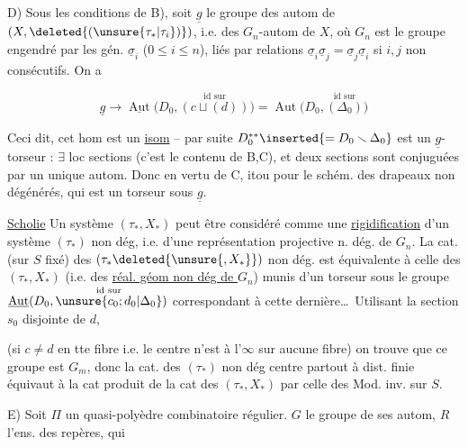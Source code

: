 
D) Sous les conditions de B), soit  $\underline g$ le groupe des autom de $(X,\deleted{(\unsure{\tau_*|\tau_i})})$, i.e. des $G_n$-autom de $X$, où $G_n$ est le groupe engendré par les gén. $\underline\sigma_i$ ($0\leq i\leq n$), liés par relations $\underline\sigma_i\underline\sigma_j=\underline\sigma_j\underline\sigma_i$ si $i,j$ non consécutifs. On a 

\[
\underline g\longrightarrow\underline{\operatorname{Aut}}\bigl(D_0,\overset{\text{id sur}}{(c\sqcup(d))}\bigr)
=\operatorname{Aut}\bigl(D_0,\overset{\text{id sur}}{(\Delta_0)}\bigr)
\]




Ceci dit, cet hom est un \uline{isom} -- par suite $D_0^{**}\inserted{=D_0\smallsetminus\Delta_0}$ est un $\underline g$-torseur : $\exists$ loc sections (c'est le contenu de B,C), et deux sections sont conjuguées par un unique autom. Donc  en vertu de C, itou pour le schém. des \inserted{$(\tau_*)$-}drapeaux non dégénérés, qui est un torseur sous $\underline g$.

\uline{Scholie} Un système $(\tau_*,X_*)$  peut être considéré comme une \uline{rigidification} d'un système $(\tau_*)$ non dég, i.e. d'une représentation projective n. dég. de $G_n$. La cat. (sur $S$ fixé) des $(\tau_*\deleted{\unsure{,X_*}})$ non dég. est équivalente à celle des $(\tau_*,X_*)$ (i.e. des \uline{réal. géom non dég de $G_n$}) munis d'un torseur sous le groupe  $\underline{\operatorname{Aut}}(D_0,\overset{\text{id sur}}{\unsure{c_0;d_0|\Delta_0}})$ correspondant à cette dernière\ldots\ Utilisant la section $s_0$ disjointe de $d$,  

(si $c\ne d$ en tte fibre i.e. le centre n'est à l'$\infty$ sur aucune fibre) on trouve que ce groupe est $G_m$, donc      la cat. des $(\tau_*)$ non dég  centre partout à dist. finie équivaut à la cat produit de la cat des $(\tau_*,X_*)$ par celle des Mod. inv. sur $S$.

E) Soit $\Pi$ un quasi-polyèdre combinatoire régulier. $G$ le groupe de ses autom, $R$ l'ens. des repères, qui

